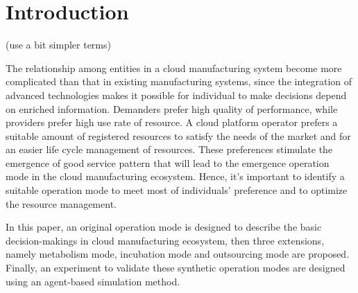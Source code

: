 \section{Introduction}
(use a bit simpler terms)

The relationship among entities in a cloud manufacturing system become more complicated than that in existing manufacturing systems, since the integration of advanced technologies makes it possible for individual to make decisions depend on enriched information. Demanders prefer high quality of performance, while providers prefer high use rate of resource. A cloud platform operator prefers a suitable amount of registered resources to satisfy the needs of the market and for an easier life cycle management of resources. These preferences stimulate the emergence of good service pattern that will lead to the emergence operation mode in the cloud manufacturing ecosystem. Hence, it's important to identify a suitable operation mode to meet most of individuals' preference and to optimize the resource management.

In this paper, an original operation mode is designed to describe the basic decision-makings in cloud manufacturing ecosystem, then three extensions, namely metabolism mode, incubation mode and outsourcing mode are proposed. Finally, an experiment to validate these synthetic operation modes are designed using an agent-based simulation method.
